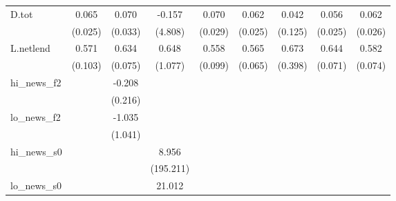 {\begin{tabular}{l*{8}{c}}
\addlinespace
D.tot       &       0.065\sym{**} &       0.070\sym{**} &      -0.157         &       0.070\sym{**} &       0.062\sym{**} &       0.042         &       0.056\sym{**} &       0.062\sym{**} \\
            &     (0.025)         &     (0.033)         &     (4.808)         &     (0.029)         &     (0.025)         &     (0.125)         &     (0.025)         &     (0.026)         \\
\addlinespace
L.netlend   &       0.571\sym{***}&       0.634\sym{***}&       0.648         &       0.558\sym{***}&       0.565\sym{***}&       0.673\sym{*}  &       0.644\sym{***}&       0.582\sym{***}\\
            &     (0.103)         &     (0.075)         &     (1.077)         &     (0.099)         &     (0.065)         &     (0.398)         &     (0.071)         &     (0.074)         \\
\addlinespace
hi\_news\_f2  &                     &      -0.208         &                     &                     &                     &                     &                     &                     \\
            &                     &     (0.216)         &                     &                     &                     &                     &                     &                     \\
\addlinespace
lo\_news\_f2  &                     &      -1.035         &                     &                     &                     &                     &                     &                     \\
            &                     &     (1.041)         &                     &                     &                     &                     &                     &                     \\
\addlinespace
hi\_news\_s0  &                     &                     &       8.956         &                     &                     &                     &                     &                     \\
            &                     &                     &   (195.211)         &                     &                     &                     &                     &                     \\
\addlinespace
lo\_news\_s0  &                     &                     &      21.012         &                     &                     &                     &                     &                     \\

\end{tabular}}
